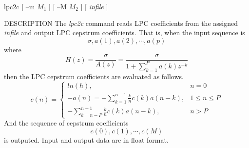 % 
% 
% 
% 
%                                                                        
%

\begin{synopsis}
 \item[lpc2c] [ --m $M_1$ ] [ --M $M_2$ ] [ {\em infile} ]
\end{synopsis}
\begin{qsection}{DESCRIPTION}
The {\em lpc2c} command reads LPC coefficients from the assigned
{\em infile} and output LPC cepstrum coefficients.
That is, when the input sequence is 
\[ \sigma, a(1), a(2), \cdots, a(p) \]
where
\[
H(z)=\frac{\sigma}{A(z)}=\frac{\sigma}{\displaystyle 1+\sum_{k=1}^P a(k) z^{-k}}
\]
then the LPC cepstrum coefficients are evaluated as follows.
\[
c(n) =\left\{
\begin{array}{lc}
 ln(h),&n=0\\
\displaystyle -a(n)=-\sum^{n-1}_{k=1}\frac{k}{n}c(k) a(n-k),&1\leq n\leq P\\
\displaystyle -\sum_{k=n-P}^{n-1}\frac{k}{n}c(k) a(n-k),& n>P
\end{array}
\right.
\]
And the sequence of cepstrum coefficients
\[ c(0), c(1), \cdots, c(M) \]
is outputed.
Input and output data are in float format.
\end{qsection}

